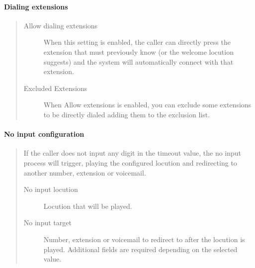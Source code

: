 \documentclass[letterpaper,10pt,english]{sphinxmanual}
\begin{document}
\paragraph{Dialing extensions}
\label{administration_portal/client/vpbx/routing_endpoints/ivrs:dialing-extensions}\begin{quote}
\begin{description}
\item[{Allow dialing extensions}] \leavevmode
When this setting is enabled, the caller can directly press the extension
that must previously know (or the welcome locution suggests) and the system
will automatically connect with that extension.

\item[{Excluded Extensions}] \leavevmode
When Allow extensions is enabled, you can exclude some extensions to be
directly dialed adding them to the exclusion list.

\end{description}
\end{quote}


\paragraph{No input configuration}
\label{administration_portal/client/vpbx/routing_endpoints/ivrs:no-input-configuration}\begin{quote}

If the caller does not input any digit in the timeout value, the
no input process will trigger, playing the configured locution and
redirecting to another number, extension or voicemail.
\begin{description}
\item[{No input locution}] \leavevmode
Locution that will be played.

\item[{No input target}] \leavevmode
Number, extension or voicemail to redirect to after the locution is played.
Additional fields are required depending on the selected value.

\end{description}
\end{quote}
\end{document}
